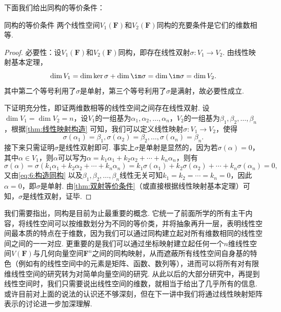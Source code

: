下面我们给出同构的等价条件：
\begin{theorem}{}{同构的等价条件}
    两个线性空间$V_1(\mathbf{F})$和$V_2(\mathbf{F})$同构的充要条件是它们的维数相等.
\end{theorem}

\begin{proof}
    必要性：设$V_1(\mathbf{F})$和$V_2(\mathbf{F})$同构，即存在线性双射$\sigma:V_1\to V_2$. 由线性映射基本定理，
    \[\dim V_1=\dim\ker\sigma+\dim\im\sigma=\dim\im\sigma=\dim V_2.\]
    其中第二个等号利用了$\sigma$是单射，第三个等号利用了$\sigma$是满射，故必要性成立.

    下证明充分性，即证两维数相等的线性空间之间存在线性双射. 设$\dim V_1=\dim V_2=n$，设$V_1$的一组基为$\alpha_1,\alpha_2,\ldots,\alpha_n$，$V_2$的一组基为$\beta_1,\beta_2,\ldots,\beta_n$，根据\autoref{thm:线性映射构造} 可知，我们可以定义线性映射$\sigma:V_1\to V_2$，使得
    \begin{equation}\label{eq:6:构造同构}
        \sigma(\alpha_1)=\beta_1,\sigma(\alpha_2)=\beta_2,\ldots,\sigma(\alpha_n)=\beta_n.
    \end{equation}
    接下来只需证明$\sigma$是线性双射即可. 事实上$\sigma$是单射是显然的，因为若$\sigma(\alpha)=0$，其中$\alpha\in V_1$，则$\alpha$可以写为$\alpha=k_1\alpha_1+k_2\alpha_2+\cdots+k_n\alpha_n$，则有
    \[\sigma(\alpha)=\sigma(k_1\alpha_1+k_2\alpha_2+\cdots+k_n\alpha_n)=k_1\sigma(\alpha_1)+k_2\sigma(\alpha_2)+\cdots+k_n\sigma(\alpha_n)=0,\]
    又由\autoref{eq:6:构造同构} 以及$\beta_1,\beta_2,\ldots,\beta_n$线性无关可知$k_1=k_2=\cdots=k_n=0$，因此$\alpha=0$，即$\sigma$是单射. 由\autoref{thm:双射等价条件}（或直接根据线性映射基本定理）可知，$\sigma$是线性双射，证毕.
\end{proof}

我们需要指出，同构是目前为止最重要的概念. 它统一了前面所学的所有主干内容，将线性空间可以按维数划分为不同的等价类，并将抽象再升一层，表明线性空间最本质的特点在于维数，因为我们可以通过同构建立起对所有维数相同的线性空间之间的一一对应. 更重要的是我们可以通过坐标映射建立起任何一个$n$维线性空间$V(\mathbf{F})$与几何向量空间$\mathbf{F}^n$之间的同构映射，从而遮蔽所有线性空间自身基的特色（例如有的线性空间中的元素是矩阵、函数、数列等），进而可以将所有对有限维线性空间的研究转为对简单向量空间的研究. 从此以后的大部分研究中，再提到线性空间时，我们只需要说出线性空间的维数，就相当于给出了几乎所有的信息. 或许目前对上面的说法的认识还不够深刻，但在下一讲中我们将通过线性映射矩阵表示的讨论进一步加深理解.

